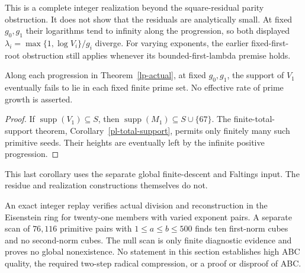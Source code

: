 This is a complete integer realization beyond the square-residual parity
obstruction. It does not show that the residuals are analytically small.
At fixed $g_0,g_1$ their logarithms tend to infinity along the progression,
so both displayed $\lambda_i=\max\{1,\log V_i\}/g_i$ diverge.
For varying exponents, the earlier fixed-first-root obstruction still
applies whenever its bounded-first-lambda premise holds.

\begin{corollary}
\label{lp-support-escape}
Along each progression in Theorem~\ref{lp-actual}, at fixed $g_0,g_1$,
the support of $V_1$ eventually fails to lie in each fixed finite prime
set. No effective rate of prime growth is asserted.
\end{corollary}
\begin{proof}
If $\operatorname{supp}(V_1)\subseteq S$, then
$\operatorname{supp}(M_1)\subseteq S\cup\{67\}$. The finite-total-
support theorem, Corollary~\ref{pl-total-support}, permits only finitely
many such primitive seeds. Their heights are eventually left by the
infinite positive progression.
\end{proof}
This last corollary uses the separate global finite-descent and Faltings
input. The residue and realization constructions themselves do not.

An exact integer replay verifies actual division and reconstruction in
the Eisenstein ring for twenty-one members with varied exponent pairs.
A separate scan of $76{,}116$ primitive pairs with $1\le a\le b\le500$
finds ten first-norm cubes and no second-norm cubes. The null scan is
only finite diagnostic evidence and proves no global nonexistence.
No statement in this section establishes high ABC quality, the required
two-step radical compression, or a proof or disproof of ABC.
